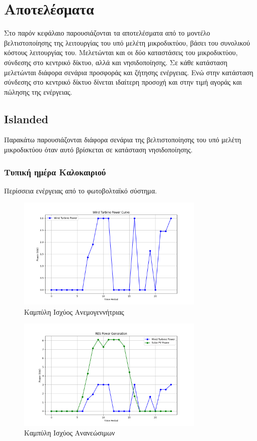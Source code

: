 \chapter{Αποτελέσματα}
Στο παρόν κεφάλαιο παρουσιάζονται τα αποτελέσματα από το μοντέλο βελτιστοποίησης της λειτουργίας του υπό μελέτη μικροδικτύου, βάσει του συνολικού κόστους λειτουργίας του.
Μελετώνται και οι δύο καταστάσεις του μικροδικτύου, σύνδεσης στο κεντρικό δίκτυο, αλλά και νησιδοποίησης. Σε κάθε κατάσταση μελετώνται διάφορα σενάρια προσφοράς και ζήτησης ενέργειας. Ενώ στην κατάσταση σύνδεσης στο κεντρικό δίκτυο δίνεται ιδαίτερη προσοχή και στην τιμή αγοράς και πώλησης της ενέργειας. 

\en
\section{Islanded}
Παρακάτω παρουσιάζονται διάφορα σενάρια της βελτιστοποίησης του υπό μελέτη μικροδικτύου όταν αυτό βρίσκεται σε κατάσταση νησιδοποίησης. 

\gr
\subsection{Τυπική ημέρα Καλοκαιριού}
Περίσσεια ενέργειας από το φωτοβολταϊκό σύστημα. 

\begin{figure}[H]  %
    \centering
    \includegraphics[width=0.8\textwidth]{figures/Figure_2.png}  %
    \caption{Καμπύλη Ισχύος Ανεμογεννήτριας}
    \label{fig:my_label}
\end{figure}

\begin{figure}[H]  %
    \centering
    \includegraphics[width=0.8\textwidth]{figures/Figure_3.png}  %
    \caption{Καμπύλη Ισχύος Ανανεώσιμων}
    \label{fig:my_label}
\end{figure}

